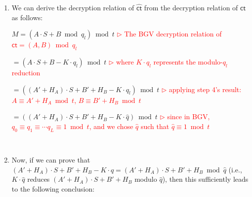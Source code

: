 \begin{enumerate}
$\hat{q}\cdot \textsf{ct} \bmod t $

$= (\hat{q}A, \hat{q}B) \bmod t$

$= (q_{l} A' + \epsilon'_A, \text{ } q_{l} B' + \epsilon'_B) \bmod t$ \textcolor{red}{ $\rhd$ applying step 1's result: $\hat{q} A = q_{l}A' + \epsilon'_A$, \text{ }  $\hat{q} B = q_{l}B' + \epsilon'_B$}

$ = (q_{l} A' + q_lH_A, \text{ } q_{l} B' + q_lH_B) \bmod t$ 
\textcolor{red}{ $\rhd$ applying step 2's result: $H_A = q_l^{-1}\cdot\epsilon'_A \bmod t$, \text{ } $H_B = q_l^{-1}\cdot\epsilon'_B \bmod t$}

$ $

$ = q_l\cdot(A' + H_A, \text{ } B' + H_B) \bmod t$


$ $

So, $\hat{q}\cdot\textsf{ct} = q_l\cdot(A' + H_A, \text{ } B' + H_B) \bmod t$. But in BGV, $q_l \equiv q_2 \equiv \cdots \equiv \hat{q} \equiv \cdots q_L \equiv 1 \bmod t$. Thus, the following holds:

$A \equiv A' + H_A \bmod t$

$B \equiv B' + H_B \bmod t$




$ $

\item We can derive the decryption relation of $\hat{\textsf{ct}}$ from the decryption relation of $\textsf{ct}$ as follows:

$M = (A\cdot S + B \bmod q_l) \bmod t$ \textcolor{red}{ $\rhd$ The BGV decryption relation of $\textsf{ct} = (A, B) \bmod q_l$}

$= (A\cdot S + B - K\cdot q_l) \bmod t$ \textcolor{red}{ $\rhd$ where $K\cdot q_l$ represents the modulo-$q_l$ reduction}

$= ((A' + H_A)\cdot S + B' + H_B - K\cdot q_{l}) \bmod t$ \textcolor{red}{ $\rhd$ applying step 4's result: $A \equiv A' + H_A \bmod t$, \text{ } $B \equiv B' + H_B \bmod t$}

$= ((A' + H_A)\cdot S + B' + H_B - K\cdot \hat{q}) \bmod t$ \textcolor{red}{ $\rhd$ since in BGV, $q_0\equiv q_1\equiv \cdots q_L \equiv 1 \bmod t$, and we chose $\hat{q}$ such that $\hat{q} \equiv 1 \bmod t$}

$ $

\item Now, if we can prove that $(A' + H_A)\cdot S + B' + H_B - K\cdot \hat{q} = (A' + H_A)\cdot S + B' + H_B \bmod \hat{q}$ (i.e., $K\cdot\hat{q}$ reduces $(A' + H_A)\cdot S + B' + H_B$ modulo $\hat{q}$), then this sufficiently leads to the following conclusion: 


\end{enumerate}
